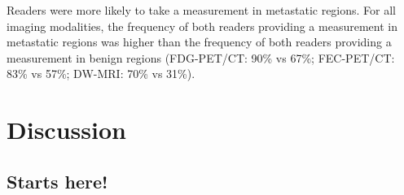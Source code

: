 \documentclass[sn-standardnature]{sn-jnl}
\theoremstyle{thmstyleone}%
\theoremstyle{thmstyletwo}%
\theoremstyle{thmstylethree}%
\begin{document}
    Readers were more likely to take a measurement in metastatic regions. For all imaging modalities, the frequency of both readers providing a measurement in metastatic regions was higher than the frequency of both readers providing a measurement in benign regions (FDG-PET/CT: 90\% vs 67\%; FEC-PET/CT: 83\% vs 57\%; DW-MRI: 70\% vs 31\%).

\section{Discussion}
    \subsection{Starts here!}

\end{document}
